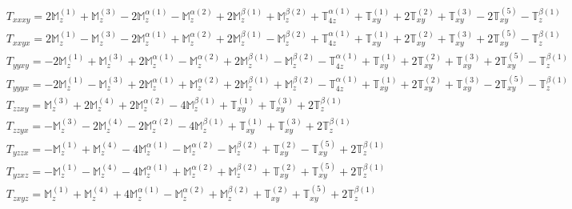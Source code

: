 \documentclass[fleqn,8pt,landscape]{jsarticle}
\begin{document}
\begin{align*}
& T_{xxxy} = 2 \mathbb{M}_{z}^{(1)} + \mathbb{M}_{z}^{(3)} - 2 \mathbb{M}_{z}^{\alpha(1)} - \mathbb{M}_{z}^{\alpha(2)} + 2 \mathbb{M}_{z}^{\beta(1)} + \mathbb{M}_{z}^{\beta(2)} + \mathbb{T}_{4z}^{\alpha(1)} + \mathbb{T}_{xy}^{(1)} + 2 \mathbb{T}_{xy}^{(2)} + \mathbb{T}_{xy}^{(3)} - 2 \mathbb{T}_{xy}^{(5)} - \mathbb{T}_{z}^{\beta(1)} \\
& T_{xxyx} = 2 \mathbb{M}_{z}^{(1)} - \mathbb{M}_{z}^{(3)} - 2 \mathbb{M}_{z}^{\alpha(1)} + \mathbb{M}_{z}^{\alpha(2)} + 2 \mathbb{M}_{z}^{\beta(1)} - \mathbb{M}_{z}^{\beta(2)} + \mathbb{T}_{4z}^{\alpha(1)} + \mathbb{T}_{xy}^{(1)} + 2 \mathbb{T}_{xy}^{(2)} + \mathbb{T}_{xy}^{(3)} + 2 \mathbb{T}_{xy}^{(5)} - \mathbb{T}_{z}^{\beta(1)} \\
& T_{yyxy} = - 2 \mathbb{M}_{z}^{(1)} + \mathbb{M}_{z}^{(3)} + 2 \mathbb{M}_{z}^{\alpha(1)} - \mathbb{M}_{z}^{\alpha(2)} + 2 \mathbb{M}_{z}^{\beta(1)} - \mathbb{M}_{z}^{\beta(2)} - \mathbb{T}_{4z}^{\alpha(1)} + \mathbb{T}_{xy}^{(1)} + 2 \mathbb{T}_{xy}^{(2)} + \mathbb{T}_{xy}^{(3)} + 2 \mathbb{T}_{xy}^{(5)} - \mathbb{T}_{z}^{\beta(1)} \\
& T_{yyyx} = - 2 \mathbb{M}_{z}^{(1)} - \mathbb{M}_{z}^{(3)} + 2 \mathbb{M}_{z}^{\alpha(1)} + \mathbb{M}_{z}^{\alpha(2)} + 2 \mathbb{M}_{z}^{\beta(1)} + \mathbb{M}_{z}^{\beta(2)} - \mathbb{T}_{4z}^{\alpha(1)} + \mathbb{T}_{xy}^{(1)} + 2 \mathbb{T}_{xy}^{(2)} + \mathbb{T}_{xy}^{(3)} - 2 \mathbb{T}_{xy}^{(5)} - \mathbb{T}_{z}^{\beta(1)} \\
& T_{zzxy} = \mathbb{M}_{z}^{(3)} + 2 \mathbb{M}_{z}^{(4)} + 2 \mathbb{M}_{z}^{\alpha(2)} - 4 \mathbb{M}_{z}^{\beta(1)} + \mathbb{T}_{xy}^{(1)} + \mathbb{T}_{xy}^{(3)} + 2 \mathbb{T}_{z}^{\beta(1)} \\
& T_{zzyx} = - \mathbb{M}_{z}^{(3)} - 2 \mathbb{M}_{z}^{(4)} - 2 \mathbb{M}_{z}^{\alpha(2)} - 4 \mathbb{M}_{z}^{\beta(1)} + \mathbb{T}_{xy}^{(1)} + \mathbb{T}_{xy}^{(3)} + 2 \mathbb{T}_{z}^{\beta(1)} \\
& T_{yzzx} = - \mathbb{M}_{z}^{(1)} + \mathbb{M}_{z}^{(4)} - 4 \mathbb{M}_{z}^{\alpha(1)} - \mathbb{M}_{z}^{\alpha(2)} - \mathbb{M}_{z}^{\beta(2)} + \mathbb{T}_{xy}^{(2)} - \mathbb{T}_{xy}^{(5)} + 2 \mathbb{T}_{z}^{\beta(1)} \\
& T_{yzxz} = - \mathbb{M}_{z}^{(1)} - \mathbb{M}_{z}^{(4)} - 4 \mathbb{M}_{z}^{\alpha(1)} + \mathbb{M}_{z}^{\alpha(2)} + \mathbb{M}_{z}^{\beta(2)} + \mathbb{T}_{xy}^{(2)} + \mathbb{T}_{xy}^{(5)} + 2 \mathbb{T}_{z}^{\beta(1)} \\
& T_{zxyz} = \mathbb{M}_{z}^{(1)} + \mathbb{M}_{z}^{(4)} + 4 \mathbb{M}_{z}^{\alpha(1)} - \mathbb{M}_{z}^{\alpha(2)} + \mathbb{M}_{z}^{\beta(2)} + \mathbb{T}_{xy}^{(2)} + \mathbb{T}_{xy}^{(5)} + 2 \mathbb{T}_{z}^{\beta(1)} \\

\end{align*}
\end{document}
